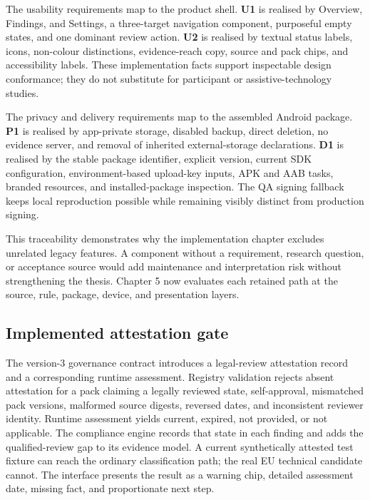 The usability requirements map to the product shell. \textbf{U1} is realised by Overview, Findings, and Settings, a three-target navigation component, purposeful empty states, and one dominant review action. \textbf{U2} is realised by textual status labels, icons, non-colour distinctions, evidence-reach copy, source and pack chips, and accessibility labels. These implementation facts support inspectable design conformance; they do not substitute for participant or assistive-technology studies.

The privacy and delivery requirements map to the assembled Android package. \textbf{P1} is realised by app-private storage, disabled backup, direct deletion, no evidence server, and removal of inherited external-storage declarations. \textbf{D1} is realised by the stable package identifier, explicit version, current SDK configuration, environment-based upload-key inputs, APK and AAB tasks, branded resources, and installed-package inspection. The QA signing fallback keeps local reproduction possible while remaining visibly distinct from production signing.

This traceability demonstrates why the implementation chapter excludes unrelated legacy features. A component without a requirement, research question, or acceptance source would add maintenance and interpretation risk without strengthening the thesis. Chapter 5 now evaluates each retained path at the source, rule, package, device, and presentation layers.
\subsection{Implemented attestation gate}

The version-3 governance contract introduces a legal-review attestation record and a corresponding runtime assessment. Registry validation rejects absent attestation for a pack claiming a legally reviewed state, self-approval, mismatched pack versions, malformed source digests, reversed dates, and inconsistent reviewer identity. Runtime assessment yields current, expired, not provided, or not applicable. The compliance engine records that state in each finding and adds the qualified-review gap to its evidence model. A current synthetically attested test fixture can reach the ordinary classification path; the real EU technical candidate cannot. The interface presents the result as a warning chip, detailed assessment date, missing fact, and proportionate next step.
